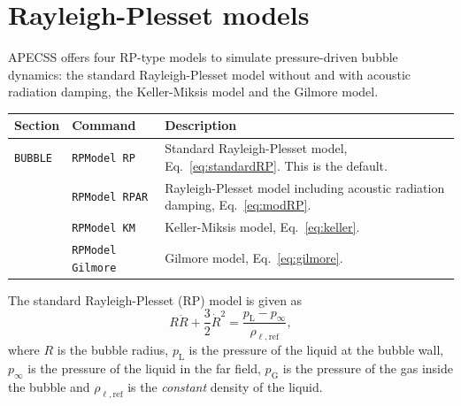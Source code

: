 \section{Rayleigh-Plesset models}
\label{sec:rpmodels}

APECSS offers four RP-type models to simulate pressure-driven bubble dynamics: the standard Rayleigh-Plesset model without and with acoustic radiation damping, the Keller-Miksis model and the Gilmore model.

\vspace{0.8em}

\noindent
\begin{tabular}{p{} p{} p{}}
    \textbf{Section} &\textbf{Command} & \textbf{Description} 
\vspace{1mm} \\ \hline
{\tt BUBBLE} & {\tt RPModel RP} & Standard Rayleigh-Plesset model, Eq.~\eqref{eq:standardRP}. This is the default.\\ 
 & {\tt RPModel RPAR} & Rayleigh-Plesset model including acoustic radiation damping, Eq.~\eqref{eq:modRP}.\\ 
 & {\tt RPModel KM} & Keller-Miksis model, Eq.~\eqref{eq:keller}.\\ 
 & {\tt RPModel Gilmore} & Gilmore model, Eq.~\eqref{eq:gilmore}.\\ 
 \hline
\end{tabular} \vspace{1em}

\noindent The standard Rayleigh-Plesset (RP) model is given as \citep{Lauterborn2010}
\begin{equation}
R \ddot{R} + \frac{3}{2} \dot{R}^2 = \frac{p_\text{L} - p_\infty}{\rho_{\ell,\mathrm{ref}}},
\label{eq:standardRP}
\end{equation}
where $R$ is the bubble radius, $p_\text{L}$ is the pressure of the liquid at the bubble wall, $p_\infty$ is the pressure of the liquid in the far field, $p_\text{G}$ is the pressure of the gas inside the bubble and $\rho_{\ell,\mathrm{ref}}$ is the {\it constant} density of the liquid.

